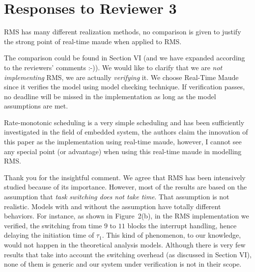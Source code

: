 \documentclass[10pt,journal]{IEEEtran}
\newcommand{\hide}[1]{\ignorespaces}
\newcommand{\ANSWER}{\medskip\noindent{\bf RESPONSE: }}
\newcommand{\COMMENT}{\medskip\noindent{\bf COMMENT: }}
\begin{document}
\section{Responses to Reviewer 3}

\COMMENT 

RMS has many different realization methods, no comparison is given to
justify the strong point of real-time maude when applied to RMS.

\ANSWER 

The comparison could be found in Section VI (and we have expanded
according to the reviewers' comments :-)). We would like to clarify
that we are \emph{not implementing} RMS, we are actually
\emph{verifying} it. We choose Real-Time Maude since it verifies the
model using model checking technique. If verification passes, no
deadline will be missed in the implementation as long as the model
assumptions are met.

\hide{
The comparison is given in the related work section (Section
VI). We would say that we are not implementing RMS algorithm in
Real-Time Maude. In fact, we are using Real-Time Maude to model an
realistic implementation of RMS from an industrial avionic
system. There is no theoretical reason telling us that we have to use
Real-Time Maude to model the RMS implementation. However, the existing
verification work as far as we know cannot fit our needs, as discussed
in Section VI. Therefore, we developed the work in the paper, as a
piece of real work in the industry.
}

\COMMENT 

Rate-monotonic scheduling is a very simple scheduling and has been
sufficiently investigated in the field of embedded system, the authors
claim the innovation of this paper as the implementation using
real-time maude, however, I cannot see any special point (or
advantage) when using this real-time maude in modelling RMS.

\ANSWER 

Thank you for the insightful comment. We agree that RMS has been
intensively studied because of its importance. However, most of the
results are based on the assumption that \emph{task switching does not
  take time}. That assumption is not realistic. Models with and
without the assumption have totally different behaviors. For instance,
as shown in Figure~2(b), in the RMS implementation we verified, the
switching from time $9$ to $11$ blocks the interrupt handling, hence
delaying the initiation time of $\tau_1$. This kind of phenomenon, to
our knowledge, would not happen in the theoretical analysis
models. Although there is very few results that take into account the
switching overhead (as discussed in Section VI), none of them is
generic and our system under verification is not in their scope.
\end{document}
